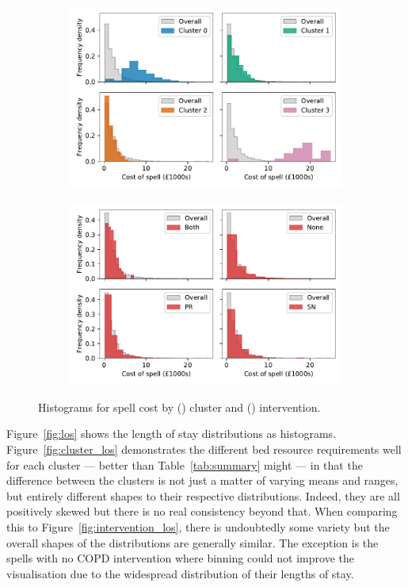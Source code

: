 \documentclass[11pt]{article}
\newlength{\imgwidth}
\begin{document}
\begin{figure}
    \centering
    \begin{subfigure}{.5\imgwidth}
        \includegraphics[width=\linewidth]{img_cluster_spell_cost}
        \caption{}\label{fig:cluster_cost}
    \end{subfigure}\hfill%
    \begin{subfigure}{.5\imgwidth}
        \includegraphics[width=\linewidth]{img_intervention_spell_cost}
        \caption{}\label{fig:intervention_cost}
    \end{subfigure}
    \caption{%
        Histograms for spell cost by () cluster and
        () intervention.
    }\label{fig:cost}
\end{figure}

Figure~\ref{fig:los} shows the length of stay distributions as histograms.
Figure~\ref{fig:cluster_los} demonstrates the different bed resource
requirements well for each cluster --- better than Table~\ref{tab:summary} might
--- in that the difference between the clusters is not just a matter of
varying means and ranges, but entirely different shapes to their respective
distributions. Indeed, they are all positively skewed but there is no real
consistency beyond that. When comparing this to
Figure~\ref{fig:intervention_los}, there is undoubtedly some variety but the
overall shapes of the distributions are generally similar. The exception is the
spells with no COPD intervention where binning could not improve the
visualisation due to the widespread distribution of their lengths of stay.
\end{document}
